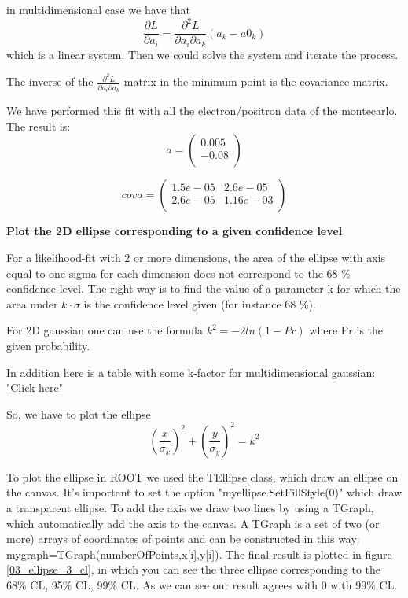 in multidimensional case we have that 
\[ \frac{\partial L}{\partial a_i} = \frac{\partial ^2 L}{\partial a_i \partial a_k} (a_k - a0_k)\]
which is a linear system. Then we could solve the system and iterate the process.

The inverse of the $\frac{\partial^2 L}{\partial a_i \partial a_k}$ matrix in the minimum point is the covariance matrix.

We have performed this fit with all the electron/positron data of the montecarlo. The result is:
\[ 
a=\left(
\begin{array}{c}
0.005\\
-0.08\\
\end{array} 
\right)
\]

\[
cova=\left(
\begin{array}{cc}
1.5e-05 & 2.6e-05\\
2.6e-05 & 1.16e-03\\
\end{array}
\right)
\]

\textbf{Plot the 2D ellipse corresponding to a given confidence level}

For a likelihood-fit with 2 or more dimensions, the area of the ellipse with axis equal to one sigma for each dimension does not correspond to the 68 \% confidence level. The right way is to find the value of a parameter k for which the area under $k \cdot \sigma$ is the confidence level given (for instance 68 \%).

For 2D gaussian one can use the formula $k^2=-2 ln(1-Pr)$ where Pr is the given probability.

In addition here is a table with some k-factor for multidimensional gaussian: \href{https://people.richland.edu/james/lecture/m170/tbl-chi.html}{"Click here"}

So, we have to plot the ellipse \[\left(\frac{x}{\sigma_x}\right)^2 + \left(\frac{y}{\sigma_y}\right)^2 = k^2 \]

To plot the ellipse in ROOT we used the TEllipse class, which draw an ellipse on the canvas. It's important to set the option "myellipse.SetFillStyle(0)" which draw a transparent ellipse. To add the axis we draw two lines by using a TGraph, which automatically add the axis to the canvas. A TGraph is a set of two (or more) arrays of coordinates of points and can be constructed in this way: mygraph=TGraph(numberOfPoints,x[i],y[i]). The final result is plotted in figure \ref{03_ellipse_3_cl}, in which you can see the three ellipse corresponding to the 68\% CL, 95\% CL, 99\% CL. As we can see our result agrees with 0 with 99\% CL.

